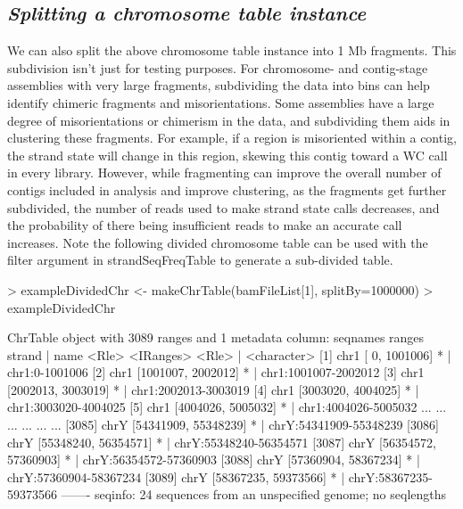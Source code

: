 \documentclass{article}
\begin{document}
\subsection{\textit{Splitting a chromosome table instance}}

We can also split the above chromosome table instance into 1 Mb fragments. This subdivision isn't just for testing purposes. For chromosome- and contig-stage assemblies with very large fragments, subdividing the data into bins can help identify chimeric fragments and misorientations. Some assemblies have a large degree of misorientations or chimerism in the data, and subdividing them aids in clustering these fragments.  For example, if a region is misoriented within a contig, the strand state will change in this region, skewing this contig toward a WC call in every library. However, while fragmenting can improve the overall number of contigs included in analysis and improve clustering, as the fragments get further subdivided, the number of reads used to make strand state calls decreases, and the probability of there being insufficient reads to make an accurate call increases.  Note the following divided chromosome table can be used with the filter argument in strandSeqFreqTable to generate a sub-divided table.

\begin{Schunk}
\begin{Sinput}
> exampleDividedChr <- makeChrTable(bamFileList[1], splitBy=1000000)
> exampleDividedChr
\end{Sinput}
\begin{Soutput}
ChrTable object with 3089 ranges and 1 metadata column:
         seqnames               ranges strand   |                   name
            <Rle>            <IRanges>  <Rle>   |            <character>
     [1]     chr1   [      0, 1001006]      *   |         chr1:0-1001006
     [2]     chr1   [1001007, 2002012]      *   |   chr1:1001007-2002012
     [3]     chr1   [2002013, 3003019]      *   |   chr1:2002013-3003019
     [4]     chr1   [3003020, 4004025]      *   |   chr1:3003020-4004025
     [5]     chr1   [4004026, 5005032]      *   |   chr1:4004026-5005032
     ...      ...                  ...    ... ...                    ...
  [3085]     chrY [54341909, 55348239]      *   | chrY:54341909-55348239
  [3086]     chrY [55348240, 56354571]      *   | chrY:55348240-56354571
  [3087]     chrY [56354572, 57360903]      *   | chrY:56354572-57360903
  [3088]     chrY [57360904, 58367234]      *   | chrY:57360904-58367234
  [3089]     chrY [58367235, 59373566]      *   | chrY:58367235-59373566
  -------
  seqinfo: 24 sequences from an unspecified genome; no seqlengths
\end{Soutput}
\end{Schunk}
\end{document}
